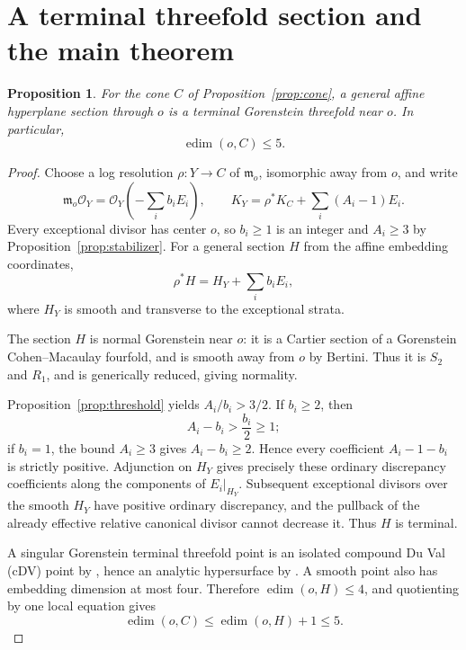 \documentclass[11pt]{article}
\newtheorem{proposition}[theorem]{Proposition}
\theoremstyle{definition}
\theoremstyle{remark}
\numberwithin{equation}{section}
\newcommand{\m}{\mathfrak m}
\newcommand{\edim}{\operatorname{edim}}
\newcommand{\cO}{\mathcal O}
\begin{document}
\section{A terminal threefold section and the main theorem}\label{sec:finish}

\begin{proposition}\label{prop:section}
For the cone \(C\) of Proposition~\ref{prop:cone}, a general affine hyperplane section through \(o\) is a terminal Gorenstein threefold near \(o\). In particular,
\[
\edim(o,C)\le5.
\]
\end{proposition}

\begin{proof}
Choose a log resolution \(\rho:Y\to C\) of \(\m_o\), isomorphic away from \(o\), and write
\[
\m_o\cO_Y=\cO_Y\left(-\sum_i b_iE_i\right),
\qquad
K_Y=\rho^*K_C+\sum_i(A_i-1)E_i.
\]
Every exceptional divisor has center \(o\), so \(b_i\ge1\) is an integer and \(A_i\ge3\) by Proposition~\ref{prop:stabilizer}. For a general section \(H\) from the affine embedding coordinates,
\[
\rho^*H=H_Y+\sum_i b_iE_i,
\]
where \(H_Y\) is smooth and transverse to the exceptional strata.

The section \(H\) is normal Gorenstein near \(o\): it is a Cartier section of a Gorenstein Cohen--Macaulay fourfold, and is smooth away from \(o\) by Bertini. Thus it is \(S_2\) and \(R_1\), and is generically reduced, giving normality.

Proposition~\ref{prop:threshold} yields \(A_i/b_i>3/2\). If \(b_i\ge2\), then
\[
A_i-b_i>\frac{b_i}{2}\ge1;
\]
if \(b_i=1\), the bound \(A_i\ge3\) gives \(A_i-b_i\ge2\). Hence every coefficient \(A_i-1-b_i\) is strictly positive. Adjunction on \(H_Y\) gives precisely these ordinary discrepancy coefficients along the components of \(E_i|_{H_Y}\). Subsequent exceptional divisors over the smooth \(H_Y\) have positive ordinary discrepancy, and the pullback of the already effective relative canonical divisor cannot decrease it. Thus \(H\) is terminal.

A singular Gorenstein terminal threefold point is an isolated compound Du Val (cDV) point by \cite[Theorem~(1.1)]{Reid}, hence an analytic hypersurface by \cite[Section~(0.5)]{Reid}. A smooth point also has embedding dimension at most four. Therefore \(\edim(o,H)\le4\), and quotienting by one local equation gives
\[
\edim(o,C)\le\edim(o,H)+1\le5.
\]
\end{proof}
\end{document}

